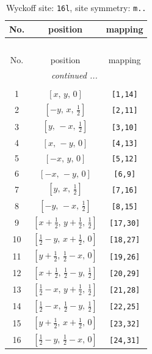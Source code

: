 \documentclass[fleqn,8pt]{jsarticle}
\begin{document}
\renewcommand{\arraystretch}{1.2}
\begin{longtable}{ccc}
\caption{Wyckoff site: {\tt 16l}, site symmetry: {\tt m..}}
 \\
 \hline \hline
No. & position & mapping \\ \hline \endfirsthead

\multicolumn{2}{l}{\tablename\ \thetable{}} \\
 \hline \hline
No. & position & mapping \\ \hline \endhead

 \hline \hline
\multicolumn{2}{r}{\footnotesize\it continued ...} \\ \endfoot

 \hline \hline
\multicolumn{2}{r}{} \\ \endlastfoot

1 & $\left[ x,\, y,\, 0 \right]$ & {\tt [1,14]} \\ \hline
2 & $\left[ - y,\, x,\, \frac{1}{2} \right]$ & {\tt [2,11]} \\ \hline
3 & $\left[ y,\, - x,\, \frac{1}{2} \right]$ & {\tt [3,10]} \\ \hline
4 & $\left[ x,\, - y,\, 0 \right]$ & {\tt [4,13]} \\ \hline
5 & $\left[ - x,\, y,\, 0 \right]$ & {\tt [5,12]} \\ \hline
6 & $\left[ - x,\, - y,\, 0 \right]$ & {\tt [6,9]} \\ \hline
7 & $\left[ y,\, x,\, \frac{1}{2} \right]$ & {\tt [7,16]} \\ \hline
8 & $\left[ - y,\, - x,\, \frac{1}{2} \right]$ & {\tt [8,15]} \\ \hline
9 & $\left[ x + \frac{1}{2},\, y + \frac{1}{2},\, \frac{1}{2} \right]$ & {\tt [17,30]} \\ \hline
10 & $\left[ \frac{1}{2} - y,\, x + \frac{1}{2},\, 0 \right]$ & {\tt [18,27]} \\ \hline
11 & $\left[ y + \frac{1}{2},\, \frac{1}{2} - x,\, 0 \right]$ & {\tt [19,26]} \\ \hline
12 & $\left[ x + \frac{1}{2},\, \frac{1}{2} - y,\, \frac{1}{2} \right]$ & {\tt [20,29]} \\ \hline
13 & $\left[ \frac{1}{2} - x,\, y + \frac{1}{2},\, \frac{1}{2} \right]$ & {\tt [21,28]} \\ \hline
14 & $\left[ \frac{1}{2} - x,\, \frac{1}{2} - y,\, \frac{1}{2} \right]$ & {\tt [22,25]} \\ \hline
15 & $\left[ y + \frac{1}{2},\, x + \frac{1}{2},\, 0 \right]$ & {\tt [23,32]} \\ \hline
16 & $\left[ \frac{1}{2} - y,\, \frac{1}{2} - x,\, 0 \right]$ & {\tt [24,31]} \\
\end{longtable}
\end{document}
